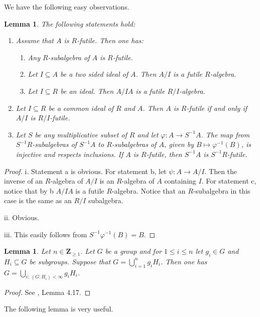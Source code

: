 \documentclass{amsart}
\theoremstyle{plain}
\newtheorem{lemma}[theorem]{Lemma}
\theoremstyle{definition}
\begin{document}
We have the following easy observations.

\begin{lemma} \label{0}
The following statements hold:
\begin{enumerate}
 \item 
 Assume that $A$ is $R$-futile. Then one has:
 \begin{enumerate}
 \item Any $R$-subalgebra of $A$ is $R$-futile.
 \item Let $I \subseteq A$ be a two sided ideal of $A$. Then $A/I$ is a futile $R$-algebra.
 \item Let $I \subseteq R$ be an ideal. Then $A/IA$ is a futile $R/I$-algebra.
\end{enumerate}
 \item
 Let $I \subseteq R$ be a common ideal of $R$ and $A$. Then $A$ is $R$-futile if and only if $A/I$ is $R/I$-futile. 
 \item
Let $S$ be any multiplicative subset of $R$ and let $\varphi: A \to S^{-1}A$. The map from $S^{-1}R$-subalgebras of $S^{-1}A$ to $R$-subalgebras of
$A$, given by $B \mapsto \varphi^{-1}(B)$, is injective and respects inclusions. If $A$ is $R$-futile, then $S^{-1}A$ is $S^{-1}R$-futile. 
\end{enumerate}
\end{lemma}
\begin{proof}
i. Statement a is obvious. For statement b, let $\psi: A \to A/I$. Then the inverse of an $R$-algebra of $A/I$ is an $R$-algebra of $A$ containing
$I$. For statement c, notice that by b $A/IA$ is a futile $R$-algebra. Notice that an $R$-subalgebra in this case is
the same as an $R/I$ subalgebra.

ii. Obvious.

iii. This easily follows from $S^{-1}\varphi^{-1}(B)=B$.

\end{proof}

\begin{lemma} \label{7}
Let $n \in {\mathbf{Z}}_{\geq 1}$. Let $G$ be a group and for $1 \leq i \leq n$ let $g_i \in G$ and $H_i \subseteq G$ be subgroups. Suppose that
$G=\bigcup_{i=1}^n g_iH_i$. Then one has
$G=\bigcup_{i:\ (G:H_i)<\infty}g_iH_i$.  
\end{lemma}
\begin{proof}
 See \cite{RO}, Lemma 4.17.
\end{proof}

The following lemma is very useful.
\end{document}
